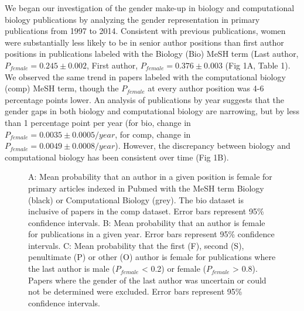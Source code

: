 \documentclass[10pt,letterpaper]{article}
\begin{document}
\begin{flushleft}
We began our investigation of the gender make-up in biology and computational biology publications by analyzing the gender representation in primary publications from 1997 to 2014. Consistent with previous publications, women were substantially less likely to be in senior author positions than first author positions in publications labeled with the Biology (Bio) MeSH term (Last author, $P_{female} = 0.245 \pm 0.002$, First author, $P_{female} = 0.376 \pm 0.003$ (Fig 1A, Table 1). We observed the same trend in papers labeled with the computational biology (comp) MeSH term, though the $P_{female}$ at every author position was 4-6  percentage points lower. An analysis of publications by year suggests that the gender gaps in both biology and computational biology are narrowing, but by less than 1 percentage point  per year (for bio, change in $P_{female} = 0.0035 \pm 0.0005 / year$, for comp, change in $P_{female} = 0.0049 \pm 0.0008 / year$). However, the discrepancy between biology and computational biology has been consistent over time (Fig 1B).

\begin{figure}[!h]
  \caption{
  A: Mean probability that an author in a given position is female for primary articles indexed in Pubmed with the MeSH term Biology (black) or Computational Biology (grey). The bio dataset is inclusive of papers in the comp dataset. Error bars represent 95\% confidence intervals. B: Mean probability that an author is female for publications in a given year. Error bars represent 95\% confidence intervals. C: Mean probability that the first (F), second (S), penultimate (P) or other (O) author is female for publications where the last author is male ($P_{female}$ < 0.2) or female ($P_{female}$ > 0.8). Papers where the gender of the last author was uncertain or could not be determined were excluded. Error bars represent 95\% confidence intervals.}
  \label{fig1}
\end{figure}


\end{flushleft}
\end{document}
